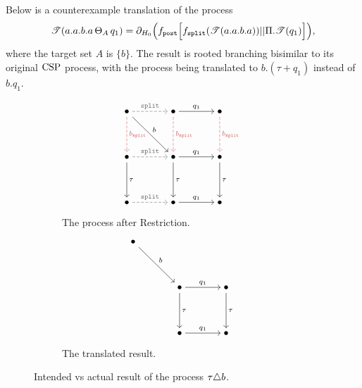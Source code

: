 \documentclass[../hons_project.tex]{subfiles}
\begin{document}
Below is a counterexample translation of the process
\begin{equation}
	\mathscr{T}(a.a.b.a \,\Theta_{A}\, q_{1})     = \partial_{H_{0}}\Bigl(f_{\mathtt{post}} \Bigl[ f_{\mathtt{split}}(\mathscr{T}(a.a.b.a)) | | \Pi.\mathscr{T}(q_{1}) \Bigr]\Bigr),
\end{equation}
where the target set $A$ is $\{b\}$. The result is rooted branching bisimilar to its original $\mathrm{CSP}$ process, with the process being translated to $b.(\tau + q_{1})$ instead of $b.q_{1}$.

\begin{figure}[H]
	\centering
	\begin{subfigure}[b]{0.45\textwidth}
		\[\begin{tikzcd}[cramped, column sep=scriptsize]
				\bullet && \bullet && \bullet \\
				\\
				\bullet && \bullet && \bullet \\
				\\
				\bullet && \bullet && \bullet
				\arrow["{\mathtt{split}}", color={rgb,255:red,110;green,110;blue,110}, dashed, from=1-1, to=1-3]
				\arrow["{b_{\mathtt{split}}}", color={rgb,255:red,214;green,92;blue,92}, dashed, from=1-1, to=3-1]
				\arrow["b", from=1-1, to=3-3]
				\arrow["{q_1}", from=1-3, to=1-5]
				\arrow["{b_{\mathtt{split}}}", color={rgb,255:red,214;green,92;blue,92}, dashed, from=1-3, to=3-3]
				\arrow["{b_{\mathtt{split}}}", color={rgb,255:red,214;green,92;blue,92}, dashed, from=1-5, to=3-5]
				\arrow["{\mathtt{split}}", color={rgb,255:red,110;green,110;blue,110}, dashed, from=3-1, to=3-3]
				\arrow["\tau", from=3-1, to=5-1]
				\arrow["{q_1}", from=3-3, to=3-5]
				\arrow["\tau", from=3-3, to=5-3]
				\arrow["\tau", from=3-5, to=5-5]
				\arrow["{\mathtt{split}}", color={rgb,255:red,110;green,110;blue,110}, dashed, from=5-1, to=5-3]
				\arrow["{q_1}", from=5-3, to=5-5]
			\end{tikzcd}\]
		\caption{The process after Restriction.}
	\end{subfigure}\hfill
	\begin{subfigure}[b]{0.45\textwidth}
		\[\begin{tikzcd}[cramped, column sep=scriptsize]
				\bullet \\
				\\
				&& \bullet && \bullet \\
				\\
				&& \bullet && \bullet
				\arrow["b", from=1-1, to=3-3]
				\arrow["{q_1}", from=3-3, to=3-5]
				\arrow["\tau", from=3-3, to=5-3]
				\arrow["\tau", from=3-5, to=5-5]
				\arrow["{q_1}", from=5-3, to=5-5]
			\end{tikzcd}\]
		\caption{The translated result.}
	\end{subfigure}
	\caption{Intended vs actual result of the process $\tau \triangle b$.}
\end{figure}

\newpage


\end{document}
